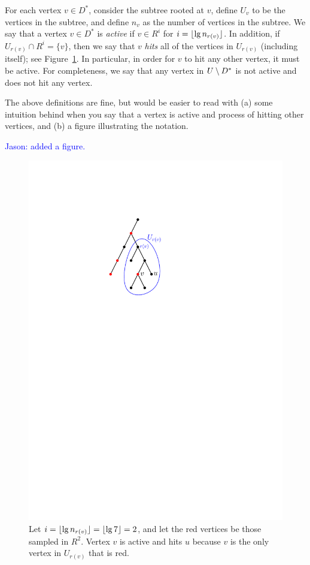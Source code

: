 For each vertex $v\in D^*$, consider the subtree rooted at $v$, define $U_v$ to be the vertices in the subtree, and define $n_v$ as the number of vertices in the subtree. We say that a vertex $v\in D^*$ is \emph{active} if $v\in R^i$ for $i=\lfloor\lg n_{r(v)}\rfloor$. In addition, if $U_{r(v)}\cap R^i=\{v\}$, then we say that $v$ \emph{hits} all of the vertices in $U_{r(v)}$ (including itself); see Figure~\ref{fig:hits}. In particular, in order for $v$ to hit any other vertex, it must be active. For completeness, we say that any vertex in $U\setminus D^*$ is not active and does not hit any vertex.

\alert{The above definitions are fine, but would be easier to read with (a) some intuition behind when you say that a vertex is active and process of hitting other vertices, and (b) a figure illustrating the notation.} 

\textcolor{blue}{Jason: added a figure.}

\begin{figure}\centering
\includegraphics[scale=1]{hits.pdf}
\caption{Let $i=\lfloor\lg n_{r(v)}\rfloor=\lfloor\lg 7\rfloor=2$, and let the red vertices be those sampled in $R^2$. Vertex $v$ is active and hits $u$ because $v$ is the only vertex in $U_{r(v)}$ that is red.}\label{fig:hits}
\end{figure}

